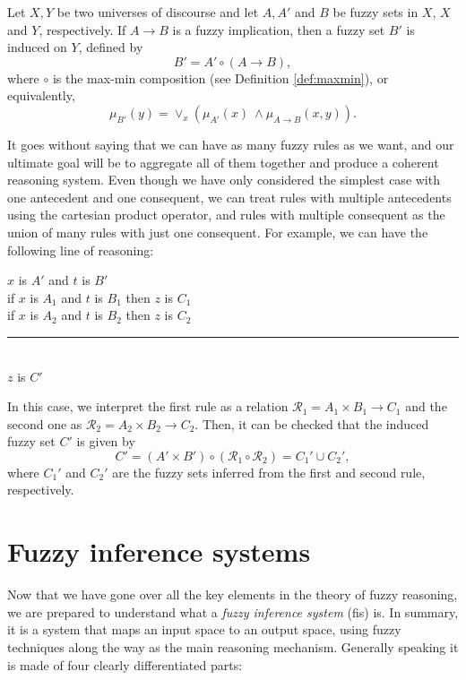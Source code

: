 \begin{definition} Let $X,Y$ be two universes of discourse and let $A, A'$ and $B$ be fuzzy sets in $X$, $X$ and $Y$, respectively. If $A\to B$ is a fuzzy implication, then a fuzzy set $B'$ is induced on $Y$, defined by
\[
B' = A' \circ (A \to B),
\]
where $\circ$ is the max-min composition (see Definition \ref{def:maxmin}), or equivalently,
\[
\mu_{B'}(y) = \lor_x (\mu_{A'}(x) \ \land \mu_{A \to B}(x, y)).
\]

\end{definition}

It goes without saying that we can have as many fuzzy rules as we want, and our ultimate goal will be to aggregate all of them together and produce a coherent reasoning system. Even though we have only considered the simplest case with one antecedent and one consequent, we can treat rules with multiple antecedents using the cartesian product operator, and rules with multiple consequent as the union of many rules with just one consequent. For example, we can have the following line of reasoning:

	\begin{center}
	  $x$ is $A'$ and $t$ is $B'$\\
    if $x$ is $A_1$ and $t$ is $B_1$ then $z$ is $C_1$\\
    if $x$ is $A_2$ and $t$ is $B_2$ then $z$ is $C_2$\\
    \rule{7cm}{0.4pt}\\
    $z$ is $C'$
  \end{center}
In this case, we interpret the first rule as a relation $\mathcal R_1 = A_1 \times B_1 \to C_1$ and the second one as $\mathcal R_2 = A_2 \times B_2 \to C_2$. Then, it can be checked that the induced fuzzy set $C'$ is given by
\[
C' = (A' \times B') \circ (\mathcal R_1 \circ \mathcal R_2) = C_1' \cup C_2',
\]
where $C_1'$ and $C_2'$ are the fuzzy sets inferred from the first and second rule, respectively.

\section{Fuzzy inference systems}

Now that we have gone over all the key elements in the theory of fuzzy reasoning, we are prepared to understand what a \textit{fuzzy inference system} (\acrshort{fis}) is. In summary, it is a system that maps an input space to an output space, using fuzzy techniques along the way as the main reasoning mechanism. Generally speaking it is made of four clearly differentiated parts:

